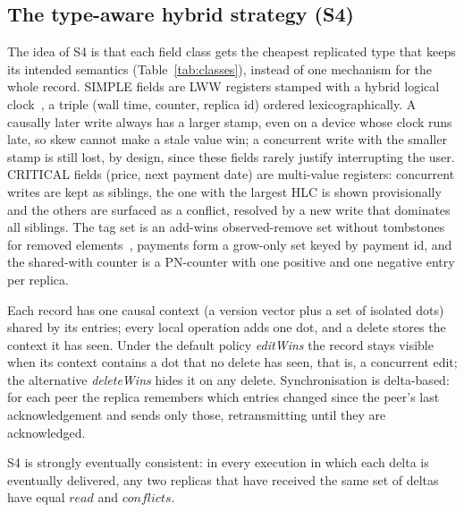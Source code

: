\subsection{The type-aware hybrid strategy (S4)}
The idea of S4 is that each field class gets the cheapest replicated type that keeps its intended semantics
(Table~\ref{tab:classes}), instead of one mechanism for the whole record.
SIMPLE fields are LWW registers stamped with a hybrid logical clock~\cite{kulkarni2014hlc}, a triple (wall time,
counter, replica id) ordered lexicographically. A causally later write always has a larger stamp, even on a device
whose clock runs late, so skew cannot make a stale value win; a concurrent write with the smaller stamp is still lost,
by design, since these fields rarely justify interrupting the user. CRITICAL fields (price, next payment date) are
multi-value registers: concurrent writes are kept as siblings, the one with the largest HLC is shown provisionally and
the others are surfaced as a conflict, resolved by a new write that dominates all siblings. The tag set is an
add-wins observed-remove set without tombstones for removed elements~\cite{bieniusa2012orset,almeida2018delta},
payments form a grow-only set keyed by payment id, and the shared-with counter is a PN-counter with one positive and
one negative entry per replica.

Each record has one causal context (a version vector plus a set of isolated dots) shared by its entries; every local
operation adds one dot, and a delete stores the context it has seen. Under the default policy \emph{editWins} the
record stays visible when its context contains a dot that no delete has seen, that is, a concurrent edit; the
alternative \emph{deleteWins} hides it on any delete. Synchronisation is delta-based: for each peer the replica
remembers which entries changed since the peer's last acknowledgement and sends only those, retransmitting until they
are acknowledged.

\begin{proposition}\label{prop:sec}
S4 is strongly eventually consistent: in every execution in which each delta is eventually delivered, any two
replicas that have received the same set of deltas have equal $\mathit{read}$ and $\mathit{conflicts}$.
\end{proposition}

